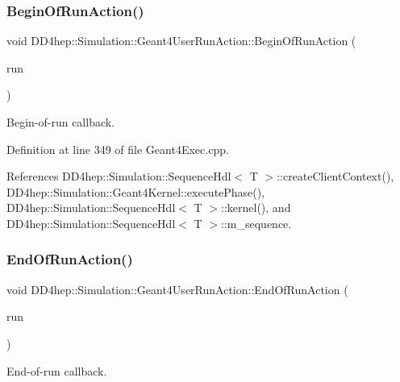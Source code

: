 \subsubsection{\texorpdfstring{Begin\+Of\+Run\+Action()}{BeginOfRunAction()}}
{\footnotesize\ttfamily void D\+D4hep\+::\+Simulation\+::\+Geant4\+User\+Run\+Action\+::\+Begin\+Of\+Run\+Action (\begin{DoxyParamCaption}\item[{const G4\+Run $\ast$}]{run }\end{DoxyParamCaption})\hspace{0.3cm}{\ttfamily [virtual]}}



Begin-\/of-\/run callback. 



Definition at line 349 of file Geant4\+Exec.\+cpp.



References D\+D4hep\+::\+Simulation\+::\+Sequence\+Hdl$<$ T $>$\+::create\+Client\+Context(), D\+D4hep\+::\+Simulation\+::\+Geant4\+Kernel\+::execute\+Phase(), D\+D4hep\+::\+Simulation\+::\+Sequence\+Hdl$<$ T $>$\+::kernel(), and D\+D4hep\+::\+Simulation\+::\+Sequence\+Hdl$<$ T $>$\+::m\+\_\+sequence.

\hypertarget{class_d_d4hep_1_1_simulation_1_1_geant4_user_run_action_acb9977f8d385a4f6523617dafea602bb}{}\label{class_d_d4hep_1_1_simulation_1_1_geant4_user_run_action_acb9977f8d385a4f6523617dafea602bb} 
\subsubsection{\texorpdfstring{End\+Of\+Run\+Action()}{EndOfRunAction()}}
{\footnotesize\ttfamily void D\+D4hep\+::\+Simulation\+::\+Geant4\+User\+Run\+Action\+::\+End\+Of\+Run\+Action (\begin{DoxyParamCaption}\item[{const G4\+Run $\ast$}]{run }\end{DoxyParamCaption})\hspace{0.3cm}{\ttfamily [virtual]}}



End-\/of-\/run callback. 



